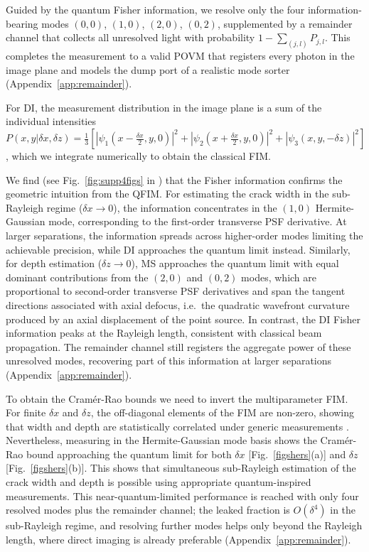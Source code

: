 \documentclass[reprint,amsmath,amssymb,aps,prl,floatfix,groupedaddress,superscriptaddress]{revtex4-2}
\begin{document}
{\color{red}Guided by the quantum Fisher information, we resolve only the four information-bearing modes $(0,0)$, $(1,0)$, $(2,0)$, $(0,2)$, supplemented by a remainder channel that collects all unresolved light with probability $1-\sum_{(j,l)}P_{j,l}$. This completes the measurement to a valid POVM that registers every photon in the image plane and models the dump port of a realistic mode sorter (Appendix~\ref{app:remainder}).}

For DI, the measurement distribution in the image plane is a sum of the individual intensities $P(x,y|\delta x,\delta z)=\frac13\left[{|{\psi_1(x\!-\!\frac{\delta x}{2},y,0)}|^2\!\! + \!|{\psi_2(x\!+\!\frac{\delta x}{2},y,0)}|^2\!\! + \!|{\psi_3(x,y,-\delta z)}|^2}\right]$, which we integrate numerically to obtain the classical FIM.

We find (see Fig.~\ref{fig:supp4figs} in \cite{supposta}) that the Fisher information confirms the geometric intuition from the QFIM. For estimating the crack width in the sub-Rayleigh regime ($\delta x \rightarrow 0$), the information concentrates  in the $(1,0)$ Hermite-Gaussian mode, corresponding to the first-order transverse PSF derivative. At larger separations, the information spreads across higher-order modes limiting the achievable precision, while  DI approaches the quantum limit instead. Similarly, for depth estimation  ($\delta z\rightarrow0$), MS approaches the quantum limit with equal dominant contributions from the $(2,0)$ and $(0,2)$ modes, which are proportional to second-order transverse PSF derivatives  and span the tangent directions associated with axial defocus{\color{red}, i.e.\ the quadratic wavefront curvature produced by an axial displacement of the point source}. In contrast, the DI Fisher information peaks at the Rayleigh length, consistent with classical beam propagation. {\color{red}The remainder channel still registers the aggregate power of these unresolved modes, recovering part of this information at larger separations (Appendix~\ref{app:remainder}).}

To obtain the Cram\'er-Rao bounds we need to invert the multiparameter FIM. For finite $\delta x$ and $\delta z$, the off-diagonal elements of the FIM are non-zero, showing that width and depth are statistically correlated under generic measurements \cite{ragy2016compatibility}. Nevertheless, measuring in the Hermite-Gaussian mode basis shows the Cram\'er-Rao bound approaching the quantum limit for both $\delta x$ [Fig.~\ref{figshers}(a)] and $\delta z$ [Fig.~\ref{figshers}(b)]. This shows that simultaneous sub-Rayleigh estimation of the crack width and depth is possible using appropriate quantum-inspired measurements. {\color{red}This near-quantum-limited performance is reached with only four resolved modes plus the remainder channel; the leaked fraction is $O(\delta^4)$ in the sub-Rayleigh regime, and resolving further modes helps only beyond the Rayleigh length, where direct imaging is already preferable (Appendix~\ref{app:remainder}).}
\end{document}
